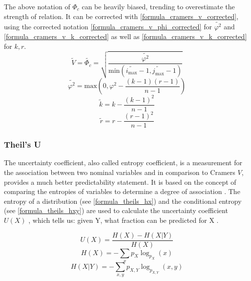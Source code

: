 \smallskip

The above notation of $\Phi_c$ can be heavily biased, trending to overestimate the strength of relation. It can be corrected with \cref{formula_cramers_v_corrected}, using the corrected notation \cref{formula_cramers_v_phi_corrected} for $\tilde{\varphi^2}$ and \cref{formula_cramers_v_k_corrected} as well as \cref{formula_cramers_v_k_corrected} for $k,r$. \parencite{Bergsma2013}
\smallskip
\begin{equation}
\label{formula_cramers_v_corrected}
	\tilde{V} = \tilde{\Phi_c} = \sqrt{\frac{\tilde{\varphi^2}}{\text{min}(\tilde{i_{\text{max}}}-1,\tilde{j_{\text{max}}}-1)}}
\end{equation}
\begin{equation}
\label{formula_cramers_v_phi_corrected}
	\tilde{\varphi^2} = \text{max}\left(0,\varphi^2 - \frac{(k-1)(r-1)}{n-1}\right)
\end{equation}
\begin{equation}
\label{formula_cramers_v_k_corrected}
	\tilde{k} = k - \frac{(k-1)^2}{n-1}
\end{equation}
\begin{equation}
\label{formula_cramers_v_r_corrected}
	\tilde{r} = r - \frac{(r-1)^2}{n-1}
\end{equation}

\bigskip

\subsubsection{Theil’s U}
The uncertainty coefficient, also called entropy coefficient, is a measurement for the association between two nominal variables and in comparison to Cramers $V$, provides a much better predictability statement. It is based on the concept of comparing the entropies of variables to determine a degree of association \parencite{Hoang2019}. The entropy of a distribution (see \cref{formula_theils_hx}) and the conditional entropy (see \cref{formula_theils_hxy}) are used to calculate the uncertainty coefficient $U(X)$ \parencite{Glen2017,Glen2018}, which tells us: given Y, what fraction can be predicted for X \parencite{Hoang2019}.

\smallskip
\begin{equation}
\label{formula_theils}
	U(X) = \frac{H(X)-H(X|Y)}{H(X)}
\end{equation}
\begin{equation}
\label{formula_theils_hx}
	H(X) = -\sum_{x} p_{X} \log_{p_X} (x)
\end{equation}
\begin{equation}
\label{formula_theils_hxy}
	H(X|Y) = -\sum_{x,y} p_{X,Y} \log_{p_{X,Y}} (x,y)
\end{equation}

